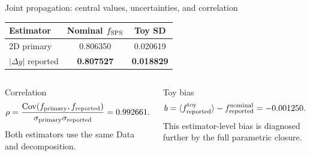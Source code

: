 \documentclass[11pt,aspectratio=169]{beamer}
\begin{document}
\begin{frame}{Joint propagation: central values, uncertainties, and correlation}
\begin{center}\begin{tabular}{lcc}\toprule Estimator&Nominal $f_{\rm SPS}$&Toy SD\\\midrule 2D primary&0.806350&0.020619\\$|\Delta y|$ reported&\textbf{0.807527}&\textbf{0.018829}\\\bottomrule\end{tabular}\end{center}
\begin{columns}[T]\begin{block}{Correlation}\[\rho=\frac{\mathrm{Cov}(f_{\rm primary},f_{\rm reported})}{\sigma_{\rm primary}\sigma_{\rm reported}}=0.992661.\]Both estimators use the same Data and decomposition.\end{block}
\begin{block}{Toy bias}\[b=\langle f_{\rm reported}^{\rm toy}\rangle-f_{\rm reported}^{\rm nominal}=-0.001250.\]This estimator-level bias is diagnosed further by the full parametric closure.\end{block}\end{columns}
\end{frame}
\end{document}
